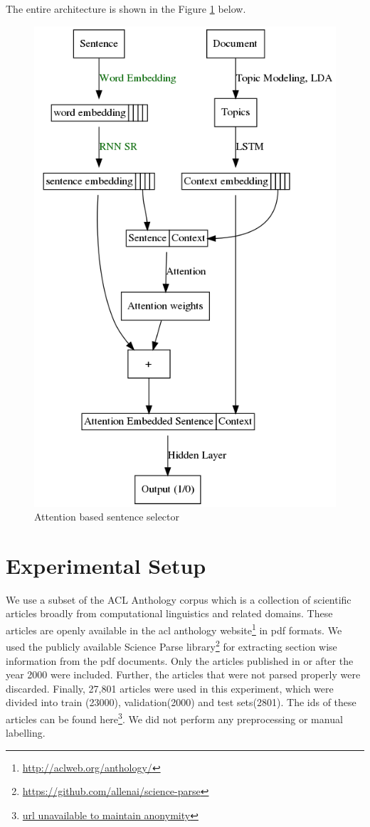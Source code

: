 The entire architecture is shown in the Figure \ref{fig1} below.
\begin{figure}
\includegraphics[scale=0.3]{graph.png}
\caption{Attention based sentence selector}	
\label{fig1}
\end{figure}


\section{Experimental Setup}

We use a subset of the ACL Anthology corpus which is a collection of scientific articles broadly from computational linguistics and related domains. These articles are openly available in the acl anthology website\footnote{\url{http://aclweb.org/anthology/}} in pdf formats. We used the publicly available Science Parse library\footnote{\url{https://github.com/allenai/science-parse}} for extracting section wise information from the pdf documents. Only the articles published in or after the year 2000 were included. Further, the articles that were not parsed properly were discarded. Finally, 27,801 articles were used in this experiment, which were divided into train (23000), validation(2000) and test sets(2801). The ids of these articles can be found here\footnote{\url{url unavailable to maintain anonymity}}. We did not perform any preprocessing or manual labelling. 

